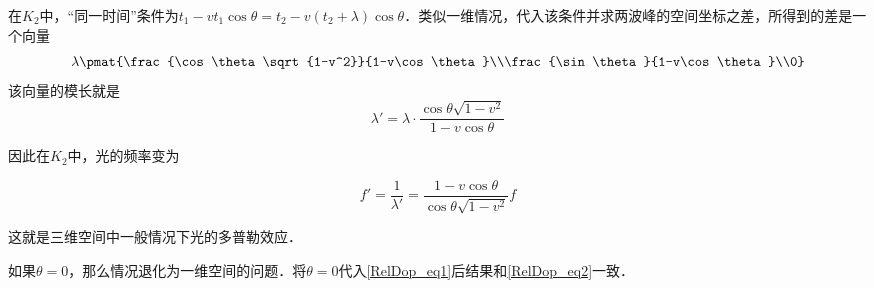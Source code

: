 在$K_2$中，“同一时间”条件为$t_1-vt_1\cos{\theta}=t_2-v(t_2+\lambda)\cos{\theta}$．类似一维情况，代入该条件并求两波峰的空间坐标之差，所得到的差是一个向量
\begin{equation}
\lambda\pmat{\frac{\cos\theta\sqrt{1-v^2}}{1-v\cos\theta}\\\frac{\sin\theta}{1-v\cos\theta}\\0}
\end{equation}
该向量的模长就是
\begin{equation}
\lambda'=\lambda\cdot\frac{\cos\theta\sqrt{1-v^2}}{1-v\cos\theta}
\end{equation}

因此在$K_2$中，光的频率变为

\begin{equation}\label{RelDop_eq1}
f'=\frac{1}{\lambda'}=\frac{1-v\cos\theta}{\cos\theta\sqrt{1-v^2}}f
\end{equation}

这就是三维空间中一般情况下光的多普勒效应．

如果$\theta=0$，那么情况退化为一维空间的问题．将$\theta=0$代入\autoref{RelDop_eq1}后结果和\autoref{RelDop_eq2}一致．

